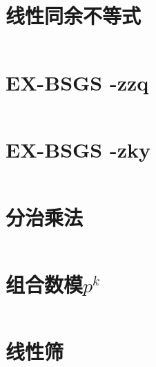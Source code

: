 \section{线性同余不等式}
\inputminted{cpp}{\source/number-theory/线性同余不等式.cpp}
\section{EX-BSGS -zzq}
\inputminted{cpp}{\source/number-theory/EX-BSGS-zzq.cpp}
\section{EX-BSGS -zky}
\inputminted{cpp}{\source/number-theory/EX-BSGS-zky.cpp}
\section{分治乘法}
\inputminted{cpp}{\source/number-theory/DAC-multiply}
\section{组合数模$p^k$}
\inputminted{cpp}{\source/number-theory/CnmmodP.cpp}
\section{线性筛}
\inputminted{cpp}{\source/number-theory/linear-sieve.cpp}
